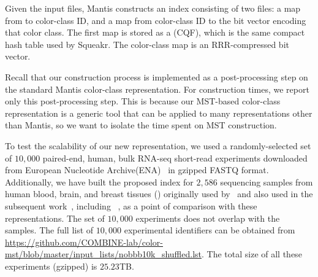 Given the input files, Mantis constructs an index consisting of two
files: a map from \kmer to color-class ID, and a map from color-class
ID to the bit vector encoding that color class.  The first map is
stored as a  (CQF), which is the same
compact hash table used by Squeakr.  The color-class map is an
RRR-compressed bit vector.

Recall that our construction process is implemented as a
post-processing step on the standard Mantis color-class
representation.  For construction times, we report only this
post-processing step.  This is because our MST-based color-class
representation is a generic tool that can be applied to many \cdbg
representations other than Mantis, so we want to isolate the time
spent on MST construction.

To test the scalability of our new \cc representation, we used a
randomly-selected set of $10,000$ paired-end, human, bulk RNA-seq short-read
experiments downloaded from European Nucleotide Archive(ENA)~\citep{nih-sra} in
gzipped FASTQ format. Additionally, we have built the proposed index for
$2,586$ sequencing samples from human blood, brain, and breast tissues (\bbb)
originally used by~\cite{Solomon2016Fast} and also used in the subsequent
work~\citep{Solomon2017Improved,Sun2017Allsome,seqothello}, including
\mantis~\citep{mantis}, as a point of comparison with these representations.
The set of $10,000$ experiments does not overlap with the \bbb samples.
The full list of $10,000$ experimental identifiers can be obtained from
\url{https://github.com/COMBINE-lab/color-mst/blob/master/input_lists/nobbb10k_shuffled.lst}.
The total size of all these experiments (gzipped) is $25.23$TB.


